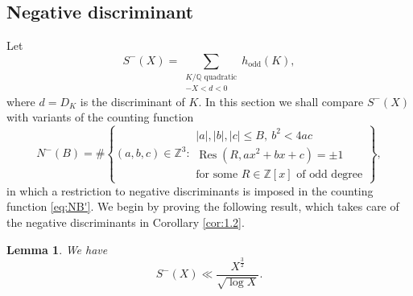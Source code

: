 \documentclass[reqno, 12pt, twoside]{amsart}
\numberwithin{equation}{section}
\DeclareMathOperator{\Res}{Res}
\newcommand{\ZZ}{\mathbb{Z}}
\newcommand{\QQ}{\mathbb{Q}}
\newcommand{\0}{\mathbf{0}}
\newtheorem{lemma}[theorem]{Lemma}
\theoremstyle{definition}
\renewcommand{\leq}{\leqslant}
\begin{document}
\subsection{Negative discriminant}\label{sec:disc1}

Let 
$$
S^-(X)=
\sum_{
\substack{K/\QQ \text{ quadratic}\\
-X<d<0
}}  h_\text{odd}(K),
$$
where $d=D_K$ is the discriminant of $K$.
In this section we shall compare 
$S^-(X)$ with variants of the counting function 
\begin{equation}\label{eq:NB-}
N^-(B)=\#\left\{(a,b,c)\in \ZZ^3: 
\begin{array}{l}
|a|,|b|,|c|\leq B, ~b^2<4ac\\
\Res(R,ax^2+bx+c)=\pm 1\\ 
\text{for some $R\in \ZZ[x]$ of odd degree}
\end{array}
\right\},
\end{equation}
in which a restriction to negative discriminants is imposed in the counting function 
\eqref{eq:NB'}.
We begin by proving the following result, which takes care of the negative discriminants in Corollary 
\ref{cor:1.2}.

\begin{lemma}\label{lem:plant}
We have 
$$
S^-(X)\ll \frac{X^{\frac{3}{2}}}{\sqrt{\log X}}. 
$$
\end{lemma}
\end{document}
